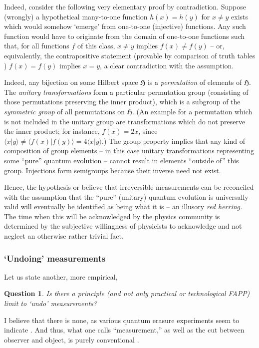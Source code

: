 \documentclass[%
  preprint,
 showpacs,
 showkeys,
 preprintnumbers,
 amsmath,amssymb,
 aps,
   pra,
  longbibliography,
 ]{revtex4-1}
\newtheorem{question}{Question}
\begin{document}
Indeed, consider the following very elementary proof by contradiction.
Suppose (wrongly) a hypothetical many-to-one function $h(x)=h(y)$ for $x\neq y$ exists which would somehow
`emerge' from one-to-one (injective) functions.
Any such function would have to originate from the domain of one-to-one functions such that,
for all functions $f$ of this class,  $x\neq y$ implies  $f(x)\neq f(y)$
-- or, equivalently, the contrapositive statement (provable by comparison of truth tables \cite[chapter~3]{Daepp})
$f(x) = f(y)$ implies $x = y$,  a clear contradiction with the assumption.

Indeed, any bijection on some Hilbert space ${\mathfrak H}$ is a {\em permutation} of elements of ${\mathfrak H}$.
The {\em unitary transformations} form a particular permutation group (consisting of those permutations preserving the inner product),
which is a subgroup of the {\em symmetric group}
of all permutations on ${\mathfrak H}$.
(An example for a permutation which is not included in the unitary group are
transformations which do not preserve the inner product;
for instance, $f(x)=2x$,  since $\langle x\vert y\rangle \neq  \langle f(x)\vert f(y)\rangle = 4 \langle x\vert y\rangle$.)
The group property implies that any kind of composition of group elements -- in this case unitary transformations
representing some ``pure'' quantum evolution -- cannot result in elements ``outside of'' this group.
Injections form semigroups because their inverse need not exist.


Hence, the hypothesis or believe that
irreversible measurements can be reconciled with the assumption that the
``pure'' (unitary) quantum evolution is universally valid will eventually
be identified as being what it is -- an illusory {\em red herring.}
The time when this will be acknowledged by the physics community is determined
by the subjective willingness of physicists to acknowledge
and not neglect an otherwise rather trivial fact.


\subsubsection{`Undoing' measurements}

Let us state another, more empirical,
{\color{blue} \begin{question}
Is there a principle (and not only practical or technological FAPP) limit to `undo' measurements?
\end{question}   }
I believe that there is none,
as various quantum erasure experiments seem to indicate
\citep{PhysRevD.22.879,PhysRevA.25.2208,greenberger2,Nature351,Zajonc-91,PhysRevA.45.7729,PhysRevLett.73.1223,PhysRevLett.75.3783,hkwz}.
And thus,
what one calls ``measurement,''
as well as the cut between observer and object, is purely conventional \cite{svozil-2001-convention}.
\end{document}

